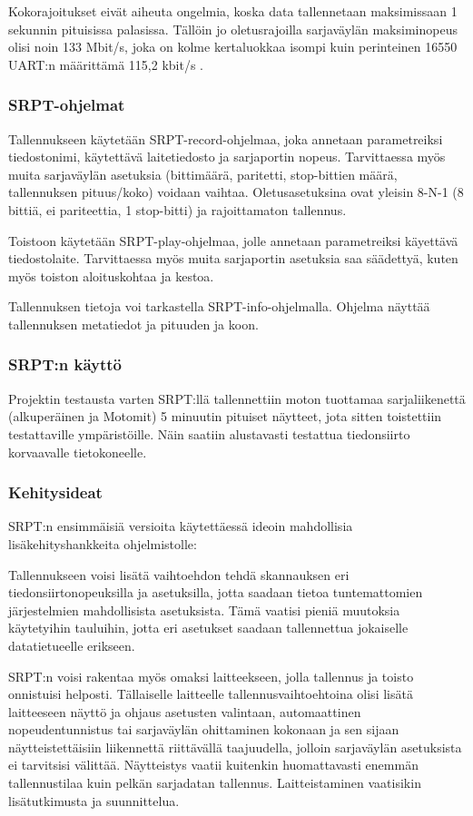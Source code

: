 Kokorajoitukset eivät aiheuta ongelmia, koska data tallennetaan maksimissaan 1 sekunnin pituisissa palasissa. Tällöin jo oletusrajoilla sarjaväylän maksiminopeus olisi noin 133 Mbit/s, joka on kolme kertaluokkaa isompi kuin perinteinen 16550 UART:n määrittämä 115,2 kbit/s \cite{sqlite:limits}.

\subsubsection{SRPT-ohjelmat}
Tallennukseen käytetään SRPT-record-ohjelmaa, joka annetaan parametreiksi tiedostonimi, käytettävä laitetiedosto ja sarjaportin nopeus. Tarvittaessa myös muita sarjaväylän asetuksia (bittimäärä, paritetti, stop-bittien määrä, tallennuksen pituus/koko) voidaan vaihtaa. Oletusasetuksina ovat yleisin 8-N-1 (8 bittiä, ei pariteettia, 1 stop-bitti) ja rajoittamaton tallennus.

Toistoon käytetään SRPT-play-ohjelmaa, jolle annetaan parametreiksi käyettävä tiedostolaite. Tarvittaessa myös muita sarjaportin asetuksia saa säädettyä, kuten myös toiston aloituskohtaa ja kestoa.

Tallennuksen tietoja voi tarkastella SRPT-info-ohjelmalla. Ohjelma näyttää tallennuksen metatiedot ja pituuden ja koon.

\subsubsection{SRPT:n käyttö}
Projektin testausta varten SRPT:llä tallennettiin moton tuottamaa sarjaliikenettä (alkuperäinen ja Motomit) 5 minuutin pituiset näytteet, jota sitten toistettiin testattaville ympäristöille. Näin saatiin alustavasti testattua tiedonsiirto korvaavalle tietokoneelle.

\subsubsection{Kehitysideat}
SRPT:n ensimmäisiä versioita käytettäessä ideoin mahdollisia lisäkehityshankkeita ohjelmistolle:

Tallennukseen voisi lisätä vaihtoehdon tehdä skannauksen eri tiedonsiirtonopeuksilla ja asetuksilla, jotta saadaan tietoa tuntemattomien järjestelmien mahdollisista asetuksista. Tämä vaatisi pieniä muutoksia käytetyihin tauluihin, jotta eri asetukset saadaan tallennettua jokaiselle datatietueelle erikseen.

SRPT:n voisi rakentaa myös omaksi laitteekseen, jolla tallennus ja toisto onnistuisi helposti. Tällaiselle laitteelle tallennusvaihtoehtoina olisi lisätä laitteeseen näyttö ja ohjaus asetusten valintaan, automaattinen nopeudentunnistus tai sarjaväylän ohittaminen kokonaan ja sen sijaan näytteistettäisiin liikennettä riittävällä taajuudella, jolloin sarjaväylän asetuksista ei tarvitsisi välittää. Näytteistys vaatii kuitenkin huomattavasti enemmän tallennustilaa kuin pelkän sarjadatan tallennus. Laitteistaminen vaatisikin lisätutkimusta ja suunnittelua.

